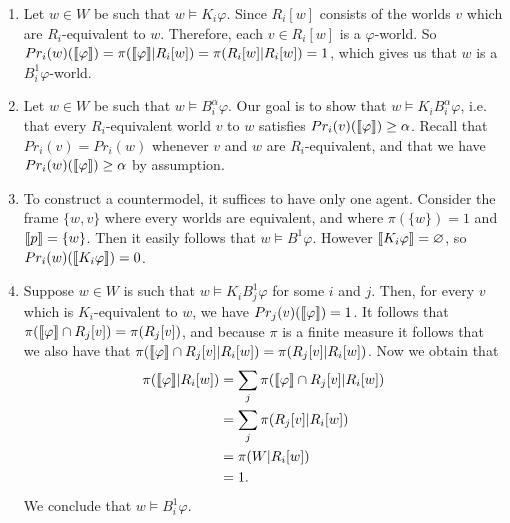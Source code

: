 \documentclass{article}
\begin{document}
\begin{ex}
\begin{enumerate}
\item Let $w\in W$ be such that $w\models K_i\varphi$. Since $R_i[w]$ consists
of the worlds $v$ which are $R_i$-equivalent to $w$. Therefore, each $v\in R_i[w]$
is a $\varphi$-world. So $Pr_i(w)(\llbracket\varphi\rrbracket)=\pi(\llbracket\varphi\rrbracket|R_i[w])=
\pi(R_i[w]|R_i[w])=1$, which gives us that $w$ is a $B^1_i\varphi$-world.
\item Let $w\in W$ be such that $w\models B^\alpha_i\varphi$. Our goal is to
show that $w\models K_iB^\alpha_i\varphi$, i.e. that every $R_i$-equivalent
world $v$ to $w$ satisfies $Pr_i(v)(\llbracket\varphi\rrbracket)\geq\alpha$. Recall that
$Pr_i(v)=Pr_i(w)$ whenever $v$ and $w$ are $R_i$-equivalent, and that we have
$Pr_i(w)(\llbracket\varphi\rrbracket)\geq\alpha$ by assumption.
\item To construct a countermodel, it suffices to have only one agent.
Consider the frame $\{w,v\}$ where every worlds are equivalent, and where
$\pi(\{w\})=1$ and $\llbracket p\rrbracket=\{w\}$. Then it easily follows that
$w\models B^1\varphi$. However $\llbracket K_i\varphi\rrbracket=\varnothing$, so
$Pr_i(w)(\llbracket K_i\varphi\rrbracket)=0$.
\item Suppose $w\in W$ is such that $w\models K_i B^1_j\varphi$ for some
$i$ and $j$. Then, for every $v$ which is $K_i$-equivalent to $w$, we have
$Pr_j(v)(\llbracket\varphi\rrbracket)=1$. It follows that 
$\pi(\llbracket\varphi\rrbracket\cap R_j[v])=\pi(R_j[v])$, and because $\pi$ is a finite
measure it follows that we also
have that $\pi(\llbracket\varphi\rrbracket\cap R_j[v]| R_i[w])=\pi(R_j[v]|R_i[w])$. Now we obtain that
\begin{align*}
\pi(\llbracket\varphi\rrbracket|R_i[w])
  & =
\sum_j \pi(\llbracket\varphi\rrbracket\cap R_j[v]| R_i[w])
  \\
  & =
\sum_j \pi(R_j[v]|R_i[w])
  \\
  & =
\pi(W|R_i[w])
  \\
  & =
1.
\end{align*}
We conclude that $w\models B^1_i\varphi$.
\end{enumerate}
\end{ex}
\end{document}
